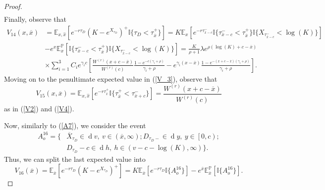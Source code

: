 \documentclass[10pt,a4paper]{amsart}
\def\E{{\mathbb{E}}}
\def\Eq{{\mathbb{E}
		_{x,\hat{x}}}}
\def\P{{\mathbb{P}}}
\def \R{{{\rm I{\!}\rm R}}}
\def \I{{\mathbb{I}}}
\newcommand{\dx}{\operatorname{d}\!}
\def\P{{\mathbb P}} \def\le{\left} \def\ri{\right} \def\i{\infty}
\def\E{{\mathbb E}} \def\PP{\mc P} \def\Z{{\mathbb Z}} \def\R{{\mathbb R}}
\begin{document}
\begin{proof}
\begin{align*}
			\end{align*}
			Finally, observe that
			\begin{align}
				\nonumber V_{14}(x,\overline{x}) &= \Eq\left[ e^{-r\tau_D} \left( K - e^{X_{\tau_D}} \right)^+ \I
				\{ \tau_D < \tau_{\overline{x}}^+ \} \right]  =  K \E_x \left[ e^{-r\tau_{\overline{x}-c}^- }
				\I \{ \tau_{\overline{x}-c}^- < \tau_{\overline{x}}^+ \}
				\I \{ X_{\tau_{\overline{x}-c}^- } < \log(K)\}
				\right] \\
				\nonumber & - e^x \E^\P_x \left[
				\I \{ \tau_{\overline{x}-c}^- < \tau_{\overline{x}}^+ \}
				\I \{ X_{\tau_{\overline{x}-c}^- } < \log(K)\}
				\right] = \frac{K}{\rho+1} \lambda e^{\rho (\log(K)+c - \overline{x})} \\
				&\times \sum_{i=1}^3 C_i e^{\gamma_i c} \left[ \frac{W^{(r)}(x+c-\overline{x})}{W^{(r)}(c)}\frac{1 - e^{-c(\gamma_i+\rho)}}{\gamma_i + \rho} - e^{\gamma_i(x - \overline{x})}\frac{1 - e^{-(x+c-\overline{x})(\gamma_i+\rho)}}{\gamma_i + \rho} \right].\label{V14}
			\end{align}
			Moving on to the penultimate expected value in (\ref{V_3}), observe that
			\begin{equation}
				V_{15}(x,\overline{x}) = 	\Eq\left[ e^{-r\tau_{\overline{x}}^+} \I
				\{\tau_{\overline{x}}^+ < \tau_{\overline{x}+c}^- \} \right] = \frac{W^{(r)}(x+c-\overline{x})}{W^{(r)}(c)}\label{V15}
			\end{equation}
			as in (\ref{V2}) and (\ref{V4}).
			
			Now, similarly to (\ref{A7}), we consider the event
			\begin{align*}
				A_o^{16} = \{& \overline{X}_{\tau_D} \in \dx v,\ v \in (\overline{x}, \infty); D_{\tau_D-} \in \dx y,\ y \in \left[ 0,c \right); \\ \nonumber & D_{\tau_D} - c \in \dx h,\ h \in (v-c-\log(K), \infty)
				\}.
			\end{align*}
			Thus, we can split the last expected value into
			\begin{equation*}
				V_{16}(\overline{x}) =	\E_{\overline{x}}\left[ e^{-r\tau_D} \left( K - e^{X_{\tau_D}} \right)^+ \right] = K\E_{\overline{x}}\left[ e^{-r\tau_D} \I \{ A_o^{16} \} \right] - e^{\overline{x}} \E^\P_{\overline{x}}\left[ \I \{ A_o^{16} \} \right].
			\end{equation*}
			

\end{proof}
\end{document}
